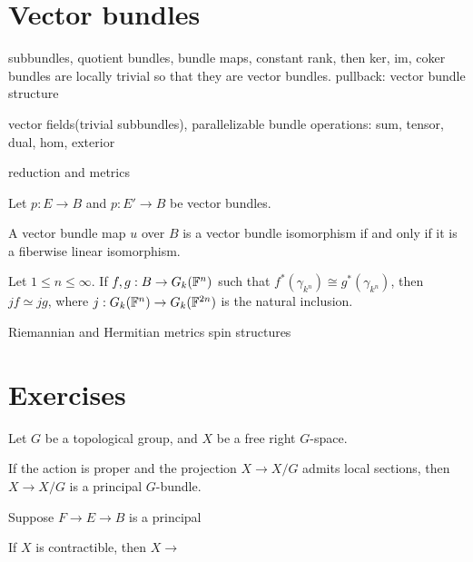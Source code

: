\documentclass{../../large}
\begin{document}
\section{Vector bundles}
subbundles, quotient bundles, bundle maps,
constant rank, then ker, im, coker bundles are locally trivial so that they are vector bundles.
pullback: vector bundle structure

vector fields(trivial subbundles), parallelizable
bundle operations: sum, tensor, dual, hom, exterior

reduction and metrics

\begin{prb}
Let $p:E\to B$ and $p:E'\to B$ be vector bundles.
\begin{parts}
\item A vector bundle map $u$ over $B$ is a vector bundle isomorphism if and only if it is a fiberwise linear isomorphism.
\end{parts}
\end{prb}



Let $1\le n\le\infty$.
If $f,g:B\to G_k(\mathbb{F}^n)$ such that $f^*(\gamma_{k^n})\cong g^*(\gamma_{k^n})$, then $jf\simeq jg$, where $j:G_k(\mathbb{F}^n)\to G_k(\mathbb{F}^{2n})$ is the natural inclusion.


\begin{prb}
Riemannian and Hermitian metrics
spin structures
\end{prb}




\section*{Exercises}

\begin{prb}
Let $G$ be a topological group, and $X$ be a free right $G$-space.
\begin{parts}
\item If the action is proper and the projection $X\to X/G$ admits local sections, then $X\to X/G$ is a principal $G$-bundle.
\end{parts}
\end{prb}

\begin{prb}
	
\end{prb}

\begin{prb}
Suppose $F\to E\to B$ is a principal 
\begin{parts}
\item If $X$ is contractible, then $X\to$
\end{parts}
\end{prb}
\end{document}
